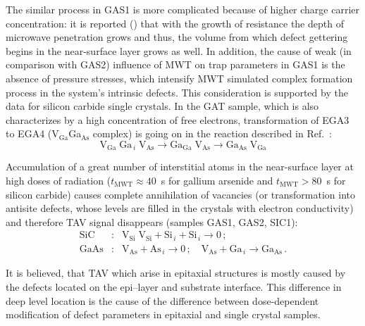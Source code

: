 \documentclass[%
 aip,jap,
 amsmath,amssymb,
 reprint,%
]{revtex4-1}
\begin{document}
The similar process in GAS1 is more complicated because of higher charge carrier concentration:
it is reported (\cite{ZOHM2000}) that with the growth of resistance the depth of microwave penetration grows
and thus, the volume from which defect gettering begins in the near-surface layer grows as well.
In addition, the cause of weak (in comparison with GAS2) influence of MWT on trap parameters in GAS1 is the absence of pressure stresses,
which intensify MWT simulated complex formation process in the system’s intrinsic defects.
This consideration is supported by the data for silicon carbide single crystals.
In the GAT sample, which is also characterizes by a high concentration of free electrons,
transformation of EGA3 to EGA4 (V$_\mathrm{Ga}$Ga$_\mathrm{As}$ complex) is going on in the reaction described in Ref.~:
\begin{displaymath}
  \mathrm{V}_\mathrm{Ga}\;\mathrm{Ga}_{\,i}\;\mathrm{V}_\mathrm{As}\rightarrow \mathrm{Ga}_\mathrm{Ga}\;\mathrm{V}_\mathrm{As}
  \rightarrow \mathrm{Ga}_\mathrm{As}\;\mathrm{V}_\mathrm{Ga}
\end{displaymath}


Accumulation of a great number of interstitial atoms in the near-surface layer at high doses of radiation
($t_\mathrm{MWT}\approx40$~s for gallium arsenide and $t_\mathrm{MWT}>80$~s for silicon carbide)
causes complete annihilation of vacancies (or transformation into antisite defects, whose levels are filled in the crystals with electron conductivity)
 and therefore TAV signal disappears (samples GAS1, GAS2, SIC1):
\begin{eqnarray}
  \nonumber
  \mathrm{SiC}&:&\mathrm{V}_\mathrm{Si}\;\mathrm{V}_\mathrm{Si}+\mathrm{Si}_{\,i}+ \mathrm{Si}_{\,i} \rightarrow 0\,;\\
  \nonumber
  \mathrm{GaAs}&:&\mathrm{V}_\mathrm{As}+\mathrm{As}_{\,i} \rightarrow 0\,;\quad
  \mathrm{V}_\mathrm{As}+\mathrm{Ga}_{\,i} \rightarrow \mathrm{Ga}_\mathrm{As}\,.
\end{eqnarray}

It is believed,\cite{OstrovskiiSST,OlikhSSC,OstrovPAN} that TAV
which arise in epitaxial structures
is mostly caused by the defects located on the epi--layer and substrate interface.
This difference in deep level location
is the cause of the difference between dose-dependent modification of defect parameters in epitaxial and single crystal samples.
\end{document}

